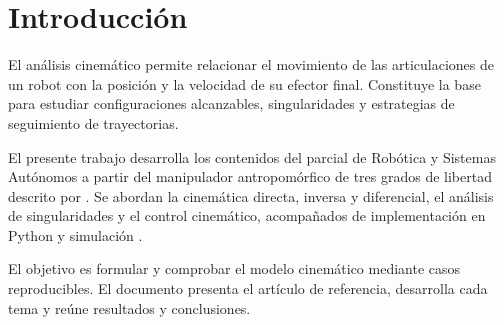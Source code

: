\section{Introducción}
El análisis cinemático permite relacionar el movimiento de las articulaciones de un robot con la posición y la velocidad de su efector final. Constituye la base para estudiar configuraciones alcanzables, singularidades y estrategias de seguimiento de trayectorias.

El presente trabajo desarrolla los contenidos del parcial de Robótica y Sistemas Autónomos a partir del manipulador antropomórfico de tres grados de libertad descrito por \textcite{ramzy2024}. Se abordan la cinemática directa, inversa y diferencial, el análisis de singularidades y el control cinemático, acompañados de implementación en Python y simulación \parencite{consigna2026}.

El objetivo es formular y comprobar el modelo cinemático mediante casos reproducibles. El documento presenta el artículo de referencia, desarrolla cada tema y reúne resultados y conclusiones.
